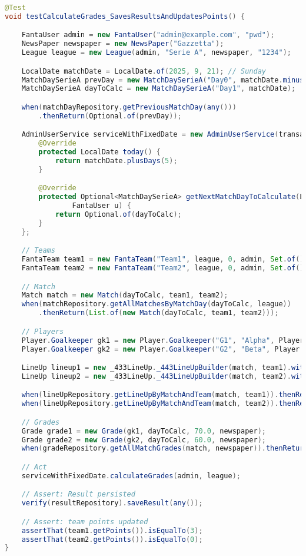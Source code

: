 \begin{lstlisting}[language=Java]
@Test
void testCalculateGrades_SavesResultsAndUpdatesPoints() {

	FantaUser admin = new FantaUser("admin@example.com", "pwd");
	NewsPaper newspaper = new NewsPaper("Gazzetta");
    League league = new League(admin, "Serie A", newspaper, "1234");

	LocalDate matchDate = LocalDate.of(2025, 9, 21); // Sunday
	MatchDaySerieA prevDay = new MatchDaySerieA("Day0", matchDate.minusWeeks(1));
	MatchDaySerieA dayToCalc = new MatchDaySerieA("Day1", matchDate);

	when(matchDayRepository.getPreviousMatchDay(any()))
        .thenReturn(Optional.of(prevDay));

    AdminUserService serviceWithFixedDate = new AdminUserService(transactionManager) {
		@Override
		protected LocalDate today() {
			return matchDate.plusDays(5);
		}

		@Override
		protected Optional<MatchDaySerieA> getNextMatchDayToCalculate(LocalDate d, TransactionContext c, League l,
				FantaUser u) {
			return Optional.of(dayToCalc);
		}
	};

	// Teams
	FantaTeam team1 = new FantaTeam("Team1", league, 0, admin, Set.of());
	FantaTeam team2 = new FantaTeam("Team2", league, 0, admin, Set.of());

	// Match
	Match match = new Match(dayToCalc, team1, team2);
	when(matchRepository.getAllMatchesByMatchDay(dayToCalc, league))
		.thenReturn(List.of(new Match(dayToCalc, team1, team2)));

	// Players
	Player.Goalkeeper gk1 = new Player.Goalkeeper("G1", "Alpha", Player.Club.ATALANTA);
	Player.Goalkeeper gk2 = new Player.Goalkeeper("G2", "Beta", Player.Club.BOLOGNA);

	LineUp lineup1 = new _433LineUp._443LineUpBuilder(match, team1).withGoalkeeper(gk1).build();
	LineUp lineup2 = new _433LineUp._443LineUpBuilder(match, team2).withGoalkeeper(gk2).build();

	when(lineUpRepository.getLineUpByMatchAndTeam(match, team1)).thenReturn(Optional.of(lineup1));
	when(lineUpRepository.getLineUpByMatchAndTeam(match, team2)).thenReturn(Optional.of(lineup2));

	// Grades
	Grade grade1 = new Grade(gk1, dayToCalc, 70.0, newspaper);
	Grade grade2 = new Grade(gk2, dayToCalc, 60.0, newspaper);
	when(gradeRepository.getAllMatchGrades(match, newspaper)).thenReturn(List.of(grade1, grade2));

	// Act
	serviceWithFixedDate.calculateGrades(admin, league);

	// Assert: Result persisted
	verify(resultRepository).saveResult(any());

	// Assert: team points updated
	assertThat(team1.getPoints()).isEqualTo(3);
	assertThat(team2.getPoints()).isEqualTo(0);
}
\end{lstlisting}



